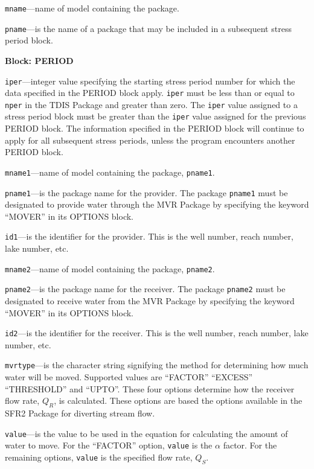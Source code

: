 \begin{description}
\item \texttt{mname}---name of model containing the package.

\item \texttt{pname}---is the name of a package that may be included in a subsequent stress period block.

\end{description}
\item \textbf{Block: PERIOD}

\begin{description}
\item \texttt{iper}---integer value specifying the starting stress period number for which the data specified in the PERIOD block apply.  \texttt{iper} must be less than or equal to \texttt{nper} in the TDIS Package and greater than zero.  The \texttt{iper} value assigned to a stress period block must be greater than the \texttt{iper} value assigned for the previous PERIOD block.  The information specified in the PERIOD block will continue to apply for all subsequent stress periods, unless the program encounters another PERIOD block.

\item \texttt{mname1}---name of model containing the package, \texttt{pname1}.

\item \texttt{pname1}---is the package name for the provider.  The package \texttt{pname1} must be designated to provide water through the MVR Package by specifying the keyword ``MOVER'' in its OPTIONS block.

\item \texttt{id1}---is the identifier for the provider.  This is the well number, reach number, lake number, etc.

\item \texttt{mname2}---name of model containing the package, \texttt{pname2}.

\item \texttt{pname2}---is the package name for the receiver.  The package \texttt{pname2} must be designated to receive water from the MVR Package by specifying the keyword ``MOVER'' in its OPTIONS block.

\item \texttt{id2}---is the identifier for the receiver.  This is the well number, reach number, lake number, etc.

\item \texttt{mvrtype}---is the character string signifying the method for determining how much water will be moved.  Supported values are ``FACTOR'' ``EXCESS'' ``THRESHOLD'' and ``UPTO''.  These four options determine how the receiver flow rate, $Q_R$, is calculated.  These options are based the options available in the SFR2 Package for diverting stream flow.

\item \texttt{value}---is the value to be used in the equation for calculating the amount of water to move.  For the ``FACTOR'' option, \texttt{value} is the $\alpha$ factor.  For the remaining options, \texttt{value} is the specified flow rate, $Q_S$.

\end{description}

